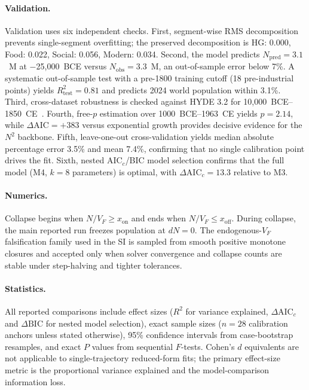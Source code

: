 \documentclass[11pt]{article}
\begin{document}
\paragraph{Validation.}
Validation uses six independent checks.
First,
segment-wise RMS decomposition prevents single-segment overfitting;
the preserved decomposition is HG:
0.000,
Food:
0.022,
Social:
0.056,
Modern:
0.034.
Second,
the model predicts
\(N_{\mathrm{pred}}=3.1\)~M at
\(-\)25,000~BCE versus
\(N_{\mathrm{obs}}=3.3\)~M,
an out-of-sample error below 7\%.
A systematic out-of-sample test with a pre-1800 training cutoff
(18 pre-industrial points)
yields
\(R^2_{\mathrm{test}}=0.81\)
and predicts 2024 world population within 3.1\%.
Third,
cross-dataset robustness is checked against HYDE 3.2 for 10,000~BCE--1850~CE~\cite{goldewijk2017}.
Fourth,
free-\(p\)
estimation over 1000~BCE--1963~CE yields
\(p=2.14\),
while
\(\Delta\mathrm{AIC}=+383\)
versus exponential growth provides decisive evidence for the
\(N^2\)
backbone.
Fifth,
leave-one-out cross-validation yields median absolute percentage error 3.5\% and mean 7.4\%,
confirming that no single calibration point drives the fit.
Sixth,
nested AIC\(_c\)/BIC model selection confirms that the full model
(M4,
\(k=8\) parameters)
is optimal,
with
\(\Delta\mathrm{AIC}_c=13.3\)
relative to M3.

\paragraph{Numerics.}
Collapse begins when
\(N/V_F\ge x_{\mathrm{on}}\)
and ends when
\(N/V_F\le x_{\mathrm{off}}\).
During collapse,
the main reported run freezes population at
\(dN=0\).
The endogenous-\(V_F\) falsification family used in the SI is sampled from smooth positive monotone closures and accepted only when solver convergence and collapse counts are stable under step-halving and tighter tolerances.

\paragraph{Statistics.}
All reported comparisons include effect sizes
(\(R^2\) for variance explained,
\(\Delta\mathrm{AIC}_c\) and
\(\Delta\mathrm{BIC}\) for nested model selection),
exact sample sizes
(\(n=28\) calibration anchors unless stated otherwise),
95\% confidence intervals from case-bootstrap resamples,
and exact
\(P\)
values from sequential
\(F\)-tests.
Cohen's
\(d\)
equivalents are not applicable to single-trajectory reduced-form fits;
the primary effect-size metric is the proportional variance explained and the model-comparison information loss.
\end{document}
